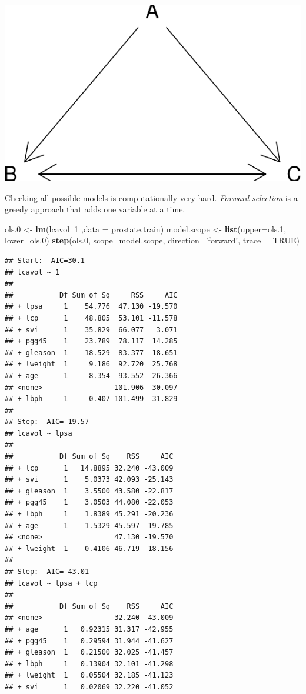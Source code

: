 \documentclass[]{book}
\newenvironment{Shaded}{\begin{snugshade}}{\end{snugshade}}
\newcommand{\DataTypeTok}[1]{\textcolor[rgb]{0.13,0.29,0.53}{#1}}
\newcommand{\DecValTok}[1]{\textcolor[rgb]{0.00,0.00,0.81}{#1}}
\newcommand{\FloatTok}[1]{\textcolor[rgb]{0.00,0.00,0.81}{#1}}
\newcommand{\KeywordTok}[1]{\textcolor[rgb]{0.13,0.29,0.53}{\textbf{#1}}}
\newcommand{\NormalTok}[1]{#1}
\newcommand{\OperatorTok}[1]{\textcolor[rgb]{0.81,0.36,0.00}{\textbf{#1}}}
\newcommand{\OtherTok}[1]{\textcolor[rgb]{0.56,0.35,0.01}{#1}}
\newcommand{\StringTok}[1]{\textcolor[rgb]{0.31,0.60,0.02}{#1}}
\theoremstyle{definition}
\theoremstyle{definition}
\theoremstyle{definition}
\theoremstyle{remark}
\begin{document}
\includegraphics[width=0.5\linewidth]{Rcourse_files/figure-latex/unnamed-chunk-222-1}

Checking all possible models is computationally very hard.
\emph{Forward selection} is a greedy approach that adds one variable at a time.

\begin{Shaded}
\begin{Highlighting}[]
\NormalTok{ols}\FloatTok{.0}\NormalTok{ <-}\StringTok{ }\KeywordTok{lm}\NormalTok{(lcavol}\OperatorTok{~}\DecValTok{1}\NormalTok{ ,}\DataTypeTok{data =}\NormalTok{ prostate.train)}
\NormalTok{model.scope <-}\StringTok{ }\KeywordTok{list}\NormalTok{(}\DataTypeTok{upper=}\NormalTok{ols}\FloatTok{.1}\NormalTok{, }\DataTypeTok{lower=}\NormalTok{ols}\FloatTok{.0}\NormalTok{)}
\KeywordTok{step}\NormalTok{(ols}\FloatTok{.0}\NormalTok{, }\DataTypeTok{scope=}\NormalTok{model.scope, }\DataTypeTok{direction=}\StringTok{'forward'}\NormalTok{, }\DataTypeTok{trace =} \OtherTok{TRUE}\NormalTok{)}
\end{Highlighting}
\end{Shaded}

\begin{verbatim}
## Start:  AIC=30.1
## lcavol ~ 1
## 
##           Df Sum of Sq     RSS     AIC
## + lpsa     1    54.776  47.130 -19.570
## + lcp      1    48.805  53.101 -11.578
## + svi      1    35.829  66.077   3.071
## + pgg45    1    23.789  78.117  14.285
## + gleason  1    18.529  83.377  18.651
## + lweight  1     9.186  92.720  25.768
## + age      1     8.354  93.552  26.366
## <none>                 101.906  30.097
## + lbph     1     0.407 101.499  31.829
## 
## Step:  AIC=-19.57
## lcavol ~ lpsa
## 
##           Df Sum of Sq    RSS     AIC
## + lcp      1   14.8895 32.240 -43.009
## + svi      1    5.0373 42.093 -25.143
## + gleason  1    3.5500 43.580 -22.817
## + pgg45    1    3.0503 44.080 -22.053
## + lbph     1    1.8389 45.291 -20.236
## + age      1    1.5329 45.597 -19.785
## <none>                 47.130 -19.570
## + lweight  1    0.4106 46.719 -18.156
## 
## Step:  AIC=-43.01
## lcavol ~ lpsa + lcp
## 
##           Df Sum of Sq    RSS     AIC
## <none>                 32.240 -43.009
## + age      1   0.92315 31.317 -42.955
## + pgg45    1   0.29594 31.944 -41.627
## + gleason  1   0.21500 32.025 -41.457
## + lbph     1   0.13904 32.101 -41.298
## + lweight  1   0.05504 32.185 -41.123
## + svi      1   0.02069 32.220 -41.052
\end{verbatim}
\end{document}
